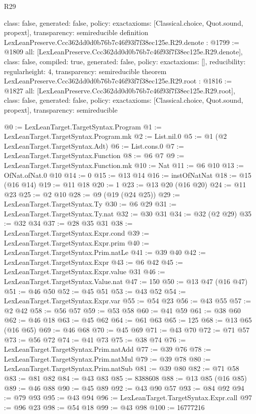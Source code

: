 \begin{lexlean}{R29}
\begin{coremodule}
{  class: false,
  generated: false,
  policy: exact{axioms: [Classical.choice, Quot.sound, propext]},
  transparency: semireducible
}
definition LexLeanPreserve.Ccc362dd0d0b76b7c46f93f7f38ec125e.R29.denote : @1799 := @1809 {
  all: [LexLeanPreserve.Ccc362dd0d0b76b7c46f93f7f38ec125e.R29.denote],
  class: false,
  compiled: true,
  generated: false,
  policy: exact{axioms: []},
  reducibility: regular{height: 4},
  transparency: semireducible
}
theorem LexLeanPreserve.Ccc362dd0d0b76b7c46f93f7f38ec125e.R29.root : @1816 := @1827 {
  all: [LexLeanPreserve.Ccc362dd0d0b76b7c46f93f7f38ec125e.R29.root],
  class: false,
  generated: false,
  policy: exact{axioms: [Classical.choice, Quot.sound, propext]},
  transparency: semireducible
}

@0 := LexLeanTarget.TargetSyntax.Program
@1 := LexLeanTarget.TargetSyntax.Program.mk
@2 := List.nil.{0}
@5 := @1 (@2 LexLeanTarget.TargetSyntax.Adt)
@6 := List.cons.{0}
@7 := LexLeanTarget.TargetSyntax.Function
@8 := @6 @7
@9 := LexLeanTarget.TargetSyntax.Function.mk
@10 := Nat
@11 := @6 @10
@13 := OfNat.ofNat.{0} @10
@14 := 0
@15 := @13 @14
@16 := instOfNatNat
@18 := @15 (@16 @14)
@19 := @11 @18
@20 := 1
@23 := @13 @20 (@16 @20)
@24 := @11 @23
@25 := @2 @10
@28 := @9 (@19 (@24 @25))
@29 := LexLeanTarget.TargetSyntax.Ty
@30 := @6 @29
@31 := LexLeanTarget.TargetSyntax.Ty.nat
@32 := @30 @31
@34 := @32 (@2 @29)
@35 := @32 @34
@37 := @28 @35 @31
@38 := LexLeanTarget.TargetSyntax.Expr.cond
@39 := LexLeanTarget.TargetSyntax.Expr.prim
@40 := LexLeanTarget.TargetSyntax.Prim.natLe
@41 := @39 @40
@42 := LexLeanTarget.TargetSyntax.Expr
@43 := @6 @42
@45 := LexLeanTarget.TargetSyntax.Expr.value @31
@46 := LexLeanTarget.TargetSyntax.Value.nat
@47 := 150
@50 := @13 @47 (@16 @47)
@51 := @46 @50
@52 := @45 @51
@53 := @43 @52
@54 := LexLeanTarget.TargetSyntax.Expr.var
@55 := @54 @23
@56 := @43 @55
@57 := @2 @42
@58 := @56 @57
@59 := @53 @58
@60 := @41 @59
@61 := @38 @60
@62 := @46 @18
@63 := @45 @62
@64 := @61 @63
@65 := 125
@68 := @13 @65 (@16 @65)
@69 := @46 @68
@70 := @45 @69
@71 := @43 @70
@72 := @71 @57
@73 := @56 @72
@74 := @41 @73
@75 := @38 @74
@76 := LexLeanTarget.TargetSyntax.Prim.natAdd
@77 := @39 @76
@78 := LexLeanTarget.TargetSyntax.Prim.natMul
@79 := @39 @78
@80 := LexLeanTarget.TargetSyntax.Prim.natSub
@81 := @39 @80
@82 := @71 @58
@83 := @81 @82
@84 := @43 @83
@85 := 8388608
@88 := @13 @85 (@16 @85)
@89 := @46 @88
@90 := @45 @89
@92 := @43 @90 @57
@93 := @84 @92
@94 := @79 @93
@95 := @43 @94
@96 := LexLeanTarget.TargetSyntax.Expr.call
@97 := @96 @23
@98 := @54 @18
@99 := @43 @98
@100 := 16777216

\end{coremodule}
\end{lexlean}
